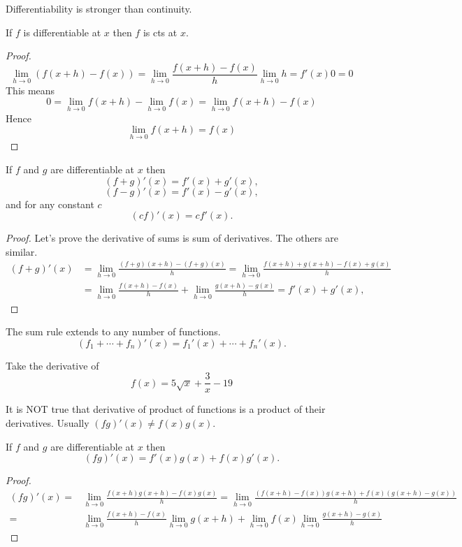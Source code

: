 \documentclass[../calc1-main.tex]{subfiles}
\begin{document}
  Differentiability is stronger than continuity.
  \begin{theorem}
    If $f$ is differentiable at $x$ then $f$ is cts at $x$.
  \end{theorem}

  \begin{proof}
    \[
      \lim_{h \to 0} (f(x+h) - f(x)) =
      \lim_{h \to 0} \dfrac{f(x+h) - f(x)}{h}
      \lim_{h \to 0} h = f'(x) 0 = 0
    \]
    This means
    \[
      0 =
      \lim_{h \to 0} f(x+h) - \lim_{h \to 0} f(x) =
      \lim_{h \to 0} f(x+h) - f(x)
    \]
    Hence
    \[
      \lim_{h \to 0} f(x+h) = f(x)
    \]
  \end{proof}

  \begin{theorem}
    If $f$ and $g$ are differentiable at $x$ then
    \[
      (f+g)'(x) = f'(x) + g'(x),
    \]
    \[
      (f-g)'(x) = f'(x) - g'(x),
    \]
    and for any constant $c$
    \[
      (c f)'(x) = c f'(x).
    \]
  \end{theorem}
  \begin{proof}
    Let's prove the derivative of sums is sum of derivatives. The others are similar.
    \[
      \begin{split}
        (f+g)'(x) &=
        \lim_{h \to 0} \frac{(f+g)(x+h) - (f+g)(x)}{h} =
        \lim_{h \to 0} \frac{f(x+h)+g(x+h) - f(x)+g(x)}{h} \\
        & = \lim_{h \to 0} \frac{f(x+h)-f(x)}{h} +
        \lim_{h \to 0} \frac{g(x+h)-g(x)}{h} =
        f'(x) + g'(x),
      \end{split}
    \]
  \end{proof}

  The sum rule extends to any number of functions.
  \[
    (f_1 + \cdots + f_n)'(x) = f_1'(x) + \cdots + f_n'(x).
  \]

  \begin{example}
    Take the derivative of
    \[
      f(x) = 5 \sqrt{x} + \frac{3}{x} - 19
    \]
  \end{example}

  It is NOT true that derivative of product of functions is a product of their derivatives. Usually $(fg)'(x) \neq f(x) g(x)$.

  \begin{theorem}
    If $f$ and $g$ are differentiable at $x$ then
    \[
      (f g)'(x) = f'(x) g(x) + f(x) g'(x).
    \]
  \end{theorem}
  \begin{proof}
     \[
       \begin{split}
        (fg)'(x) = & \lim_{h \to 0} \frac{f(x+h)g(x+h)-f(x)g(x)}{h} =
        \lim_{h \to 0} \frac{\left( f(x+h)-f(x) \right)g(x+h) + f(x)\left( g(x+h) -g(x) \right)}{h} \\
        = & \lim_{h \to 0} \frac{f(x+h)-f(x)}{h} \lim_{h \to 0 }g(x+h) +
        \lim_{h \to 0} f(x) \lim_{h \to 0} \frac{g(x+h) -g(x) }{h}
       \end{split}
     \]
  \end{proof}
\end{document}
